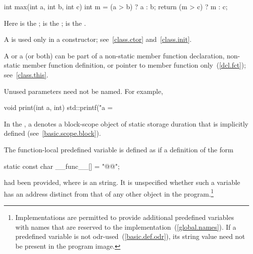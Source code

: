 %
\begin{codeblock}
int max(int a, int b, int c) {
  int m = (a > b) ? a : b;
  return (m > c) ? m : c;
}
\end{codeblock}

Here
is the
;
is the
;
is the
.
\exitexample

\pnum
{}%
%
%
A
is used only in a constructor; see~\ref{class.ctor} and~\ref{class.init}.

\pnum
A
 or a  (or both)
can be part of a non-static member function declaration, non-static member function definition,
or pointer to member function only~(\ref{dcl.fct}); see~\ref{class.this}.

\pnum
\enternote
Unused parameters need not be named.
For example,

%
\begin{codeblock}
void print(int a, int) {
  std::printf("a = %
}
\end{codeblock}
\exitnote

\pnum
In the , a
 denotes a block-scope object of static
storage duration that is implicitly defined (see~\ref{basic.scope.block}).

\pnum
The function-local predefined variable  is
defined as if a definition of the form

\begin{codeblock}
static const char __func__[] = "@@";
\end{codeblock}

had been provided, where  is an  string. It is unspecified whether such a variable has an address
distinct from that of any other object in the program.\footnote{Implementations are
permitted to provide additional predefined variables with names that are reserved to the
implementation~(\ref{global.names}). If a predefined variable is not
odr-used~(\ref{basic.def.odr}), its string value need not be present in the program image.}

